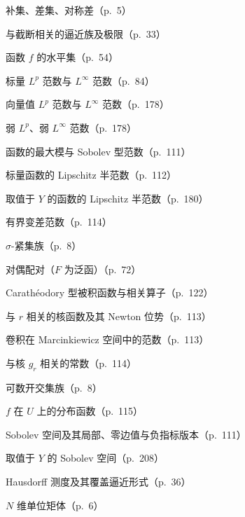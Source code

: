 \documentclass[../main.tex]{subfiles}
\begin{document}
\begin{description}[style=nextline,leftmargin=1.2em,itemsep=1pt,topsep=2pt,font=\normalfont\small]
\item[{$E^c,\ E\setminus F,\ E\triangle F$}] 补集、差集、对称差（p.~5）
\item[{$\eta_\delta^*,\ \eta_\infty^*,\ \eta^*$}] 与截断相关的逼近族及极限（p.~33）
\item[{$\{f>\alpha\},\{f\geqslant\alpha\},\{f<\alpha\},\{f\leqslant\alpha\},\{f=\alpha\}$}] 函数 $f$ 的水平集（p.~54）
\item[{$\|f\|_p,\ \|f\|_\infty$（标量函数）}] 标量 $L^p$ 范数与 $L^\infty$ 范数（p.~84）
\item[{$\|f\|_p,\ \|f\|_\infty$（向量函数）}] 向量值 $L^p$ 范数与 $L^\infty$ 范数（p.~178）
\item[{$\|f\|_p^*,\ \|f\|_\infty^*$}] 弱 $L^p$、弱 $L^\infty$ 范数（p.~178）
\item[{$\|f\|_\infty,\ \|f\|_{m,p}$}] 函数的最大模与 Sobolev 型范数（p.~111）
\item[{$\|f\|_{\operatorname{Lip}(U)}$}] 标量函数的 Lipschitz 半范数（p.~112）
\item[{$\|f\|_{\operatorname{Lip}(U;Y)}$}] 取值于 $Y$ 的函数的 Lipschitz 半范数（p.~180）
\item[{$\|f\|_{BV(U)}$}] 有界变差范数（p.~114）
\item[{$\mathcal{F}_\sigma$}] $\sigma$-紧集族（p.~8）
\item[{$\langle F,f\rangle$}] 对偶配对（$F$ 为泛函）（p.~72）
\item[{$g(x,\mu),\ g(\nu,y),\ g(\nu,\mu),\ G_\mu f,\ G_\nu f$}] Carathéodory 型被积函数与相关算子（p.~122）
\item[{$g_r,\ G_r$}] 与 $r$ 相关的核函数及其 Newton 位势（p.~113）
\item[{$\|g_r*f\|_{L^{r,p}(\mathbb{R}^N)}$}] 卷积在 Marcinkiewicz 空间中的范数（p.~113）
\item[{$\gamma_r$}] 与核 $g_r$ 相关的常数（p.~114）
\item[{$G_\delta$}] 可数开交集族（p.~8）
\item[{$\Gamma(f;U)$}] $f$ 在 $U$ 上的分布函数（p.~115）
\item[{$H^m(U),\ H^m_{\mathrm{loc}}(U),\ H^m_0(U),\ H^{-m}(U)$}] Sobolev 空间及其局部、零边值与负指标版本（p.~111）
\item[{$H^m(U;Y)$}] 取值于 $Y$ 的 Sobolev 空间（p.~208）
\item[{$\mathcal{H}^*_{h,\delta},\mathcal{H}^*_{h,\infty},\mathcal{H}^*_h,\mathcal{H}_h,\mathcal{H}^*_{s,\delta},\mathcal{H}^*_s,\mathcal{H}_s$}] Hausdorff 测度及其覆盖逼近形式（p.~36）
\item[{$\mathcal{I}_N$}] $N$ 维单位矩体（p.~6）

\end{description}
\end{document}
